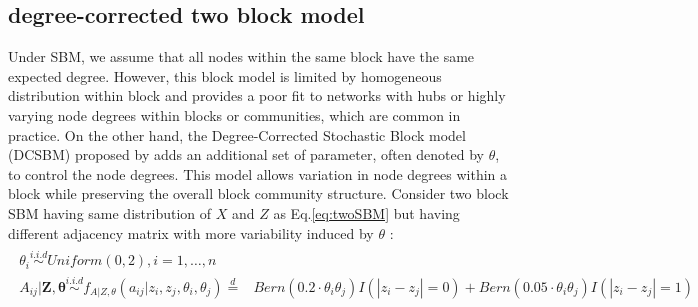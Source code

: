 \documentclass[12pt]{article}
\theoremstyle{definition}
\begin{document}
\subsection{degree-corrected two block model}

Under SBM, we assume that all nodes within the same block have the same expected degree. However, this block model is limited by homogeneous distribution within block and provides a poor fit to networks with hubs or highly varying node degrees within blocks or communities, which are common in practice. On the other hand, the Degree-Corrected Stochastic Block model (DCSBM) proposed by \cite{karrer2011stochastic} adds an additional set of parameter, often denoted by $\theta$, to control the node degrees. This model allows variation in node degrees within a block while preserving the overall block community structure. Consider two block SBM having same distribution of $X$ and $Z$ as Eq.\ref{eq:twoSBM} but having different adjacency matrix with more variability induced by $\theta$ : 
\begin{equation}
\label{eq:dcSBM}
\begin{gathered}
\begin{split}
\theta_{i} \overset{i.i.d}{\sim} Uniform(0,2), i = 1, \ldots, n \\ 
A_{ij} | \mathbf{Z}, \mathbf{\theta}   \overset{i.i.d}{\sim}   f_{A|Z, \theta}(a_{ij} | z_{i}, z_{j}, \theta_{i}, \theta_{j}) \stackrel{d}{=} & Bern(0.2 \cdot \theta_{i}\theta_{j}) I ( |z_{i} - z_{j}| = 0 )  + Bern(0.05 \cdot \theta_{i} \theta_{j} ) I(|z_{i} - z_{j}| = 1) \\
\end{split}
\end{gathered}
\end{equation}
\end{document}
